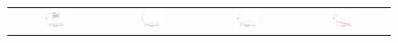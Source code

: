 \begin{figure}[!t]
  \renewcommand{\tabcolsep}{1pt}
  \begin{tabular}{cccc}
    \includegraphics[width=0.26\textwidth]{../experiment/figure_new/sp_sym_gauss_k_2} &      
    \includegraphics[width=0.26\textwidth]{../experiment/figure_new/sp_sym_gauss_k_3} &      
    \includegraphics[width=0.26\textwidth]{../experiment/figure_new/sp_sym_gauss_k_4} &    
    \includegraphics[width=0.26\textwidth]{../experiment/figure_new/sp_sym_gauss_k_8} \\    


\end{tabular}
\end{figure}

